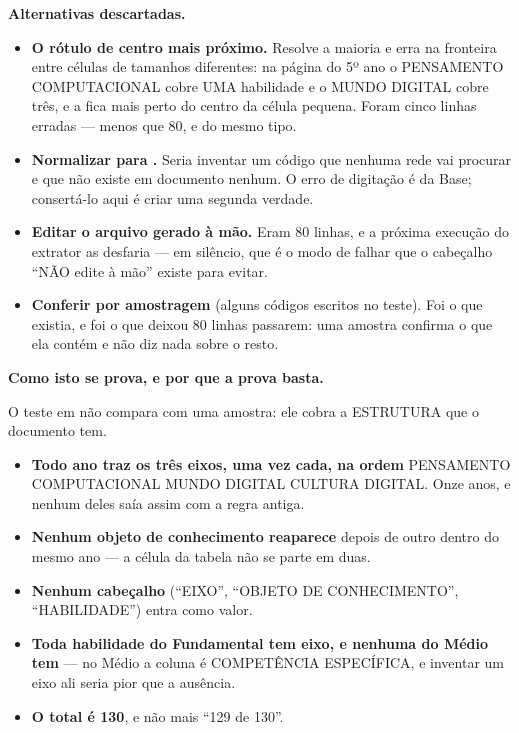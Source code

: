 \textbf{Alternativas descartadas.}

\begin{itemize}
  \item \textbf{O rótulo de centro mais próximo.} Resolve a maioria e erra na
    fronteira entre células de tamanhos diferentes: na página do 5º ano o
    PENSAMENTO COMPUTACIONAL cobre UMA habilidade e o MUNDO DIGITAL cobre três,
    e a  fica mais perto do centro da célula pequena. Foram cinco
    linhas erradas --- menos que 80, e do mesmo tipo.
  \item \textbf{Normalizar  para .} Seria inventar um
    código que nenhuma rede vai procurar e que não existe em documento nenhum.
    O erro de digitação é da Base; consertá-lo aqui é criar uma segunda verdade.
  \item \textbf{Editar o arquivo gerado à mão.} Eram 80 linhas, e a próxima
    execução do extrator as desfaria --- em silêncio, que é o modo de falhar que
    o cabeçalho \enquote{NÃO edite à mão} existe para evitar.
  \item \textbf{Conferir por amostragem} (alguns códigos escritos no teste). Foi
    o que existia, e foi o que deixou 80 linhas passarem: uma amostra confirma o
    que ela contém e não diz nada sobre o resto.
\end{itemize}

\textbf{Como isto se prova, e por que a prova basta.}

O teste em  não compara com uma
amostra: ele cobra a ESTRUTURA que o documento tem.

\begin{itemize}
  \item \textbf{Todo ano traz os três eixos, uma vez cada, na ordem} PENSAMENTO
    COMPUTACIONAL \seta{} MUNDO DIGITAL \seta{} CULTURA DIGITAL. Onze anos, e
    nenhum deles saía assim com a regra antiga.
  \item \textbf{Nenhum objeto de conhecimento reaparece} depois de outro dentro
    do mesmo ano --- a célula da tabela não se parte em duas.
  \item \textbf{Nenhum cabeçalho} (\enquote{EIXO}, \enquote{OBJETO DE
    CONHECIMENTO}, \enquote{HABILIDADE}) entra como valor.
  \item \textbf{Toda habilidade do Fundamental tem eixo, e nenhuma do Médio
    tem} --- no Médio a coluna é COMPETÊNCIA ESPECÍFICA, e inventar um eixo ali
    seria pior que a ausência.
  \item \textbf{O total é 130}, e não mais \enquote{129 de 130}.
\end{itemize}

